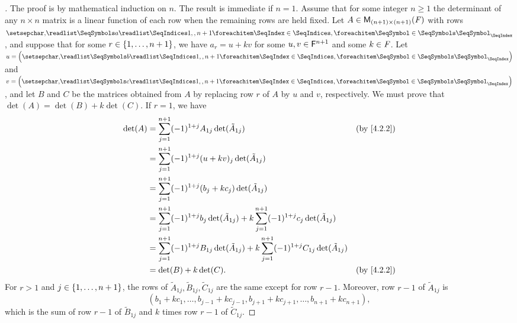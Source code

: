 \begin{proof}[]
  The proof is by mathematical induction on \(n\).
  The result is immediate if \(n = 1\).
  Assume that for some integer \(n \geq 1\) the determinant of any \(n \times n\) matrix is a linear function of each row when the remaining rows are held fixed.
  Let \(A \in \mathsf{M}_{{(n + 1)} \times (n + 1)}({\mathit{F}})\) with rows \(\seq{a}{1,,n+1}\), and suppose that for some \(r \in \left\lbrace1, \dots, n + 1\right\rbrace\), we have \(a_r = u + kv\) for some \(u, v \in \mathsf{F}^{n + 1}\) and some \(k \in \mathit{F}\).
  Let \(u = \tuple{b}{1,,n+1}\) and \(v = \tuple{c}{1,,n+1}\), and let \(B\) and \(C\) be the matrices obtained from \(A\) by replacing row \(r\) of \(A\) by \(u\) and \(v\), respectively.
  We must prove that \(\det(A) = \det(B) + k \det(C)\).
  If \(r = 1\), we have
  \begin{align*}
    \det(A) & = \sum_{j = 1}^{n + 1} (-1)^{1 + j} A_{1 j} \det(\tilde{A}_{1 j})                                                                     &  & \text{(by \cref{4.2.2})} \\
            & = \sum_{j = 1}^{n + 1} (-1)^{1 + j} (u + kv)_j \det(\tilde{A}_{1 j})                                                                                                \\
            & = \sum_{j = 1}^{n + 1} (-1)^{1 + j} (b_j + k c_j) \det(\tilde{A}_{1 j})                                                                                             \\
            & = \sum_{j = 1}^{n + 1} (-1)^{1 + j} b_j \det(\tilde{A}_{1 j}) + k \sum_{j = 1}^{n + 1} (-1)^{1 + j} c_j \det(\tilde{A}_{1 j})                                       \\
            & = \sum_{j = 1}^{n + 1} (-1)^{1 + j} B_{1 j} \det(\tilde{A}_{1 j}) + k \sum_{j = 1}^{n + 1} (-1)^{1 + j} C_{1 j} \det(\tilde{A}_{1 j})                               \\
            & = \det(B) + k \det(C).                                                                                                                &  & \text{(by \cref{4.2.2})}
  \end{align*}
  For \(r > 1\) and \(j \in \left\lbrace1, \dots, n + 1\right\rbrace\), the rows of \(\tilde{A}_{1 j}, \tilde{B}_{1 j}, \tilde{C}_{1 j}\) are the same except for row \(r - 1\).
  Moreover, row \(r - 1\) of \(\tilde{A}_{1 j}\) is
  \[
    (b_1 + k c_1, \dots, b_{j - 1} + k c_{j - 1}, b_{j + 1} + k c_{j + 1}, \dots, b_{n + 1} + k c_{n + 1}),
  \]
  which is the sum of row \(r - 1\) of \(\tilde{B}_{1 j}\) and \(k\) times row \(r - 1\) of \(\tilde{C}_{1 j}\).

\end{proof}
